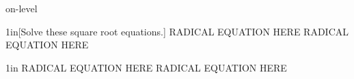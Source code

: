 \begin{taggedblock}{on-level}



\begin{my2Problems}[\normalsize]{1in}[Solve these square root equations.]
    {
        RADICAL EQUATION HERE
    }
    {
        RADICAL EQUATION HERE
    }
\end{my2Problems}

\begin{my2Problems}[\normalsize]{1in}
    {
        RADICAL EQUATION HERE
    }
    {
        RADICAL EQUATION HERE
    }
\end{my2Problems}



\end{taggedblock}